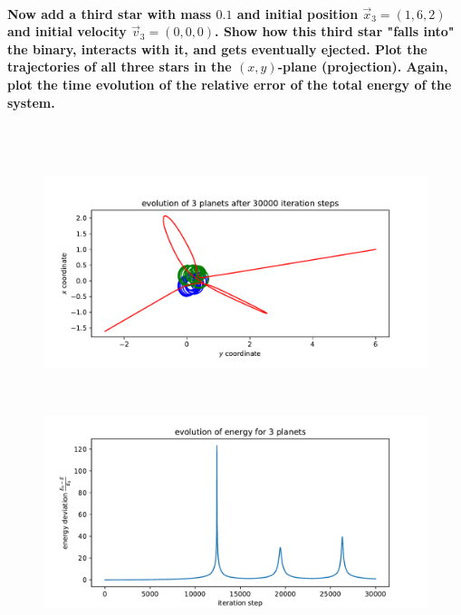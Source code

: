     \paragraph{Now add a third star with mass $0.1$ and initial position 
        $\vec x_3=(1,6,2)$ and initial velocity $\vec v_3=(0,0,0)$. Show how 
        this third star "falls into" the binary, interacts with it, and gets 
        eventually ejected. Plot the trajectories of all three stars in the 
        $(x,y)$-plane (projection). Again, plot the time evolution of the 
        relative error of the total energy of the system.
    } \ \\
        \\
        \begin{figure}[h!]
            \centering
            \includegraphics[width=\textwidth]{./figures/task2_3body.pdf}
        \end{figure} \ \\ 
        \begin{figure}[h!]
            \centering
            \includegraphics[width=\textwidth]{./figures/task2_3body_energy_new.pdf}
        \end{figure} \ \\ 
    
